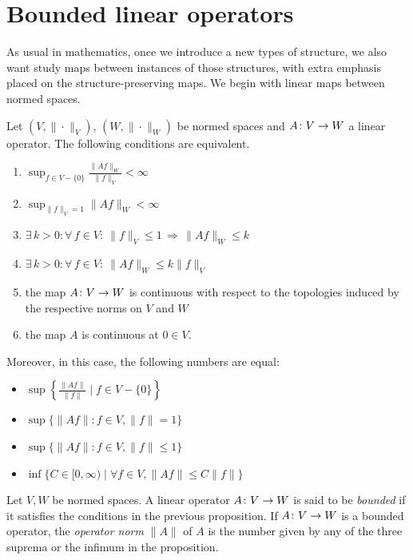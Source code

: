 \section{Bounded linear operators}

As usual in mathematics, once we introduce a new types of structure,
we also want study maps between instances of those structures, with
extra emphasis placed on the structure-preserving maps.
We begin with linear maps between normed spaces.

\begin{proposition}
\label{prp:boundequiv}
Let $(V,\|\cdot\|_V)$, $(W,\|\cdot\|_W)$ be normed spaces
and $A\colon V\to W$ a linear operator.
The following conditions are equivalent.
\begin{enumerate}[label=(\roman*)]
  \item \(\displaystyle \sup_{f\in V-\{0\}}\frac{\|Af\|_W }{ \|f\|_V}
    < \infty\)
  \item $\displaystyle \sup_{\|f\|_V=1}\|Af\|_W< \infty$
  \item $\exists \, k > 0 : \forall \, f\in V: \ \|f\|_V \leq 1\, \Rightarrow \, \|Af\|_W \leq k$
  \item $\exists \, k > 0 : \forall \, f\in V: \ \|Af\|_W\leq  k \|f\|_V$
  \item the map $A\colon V \to W$ is continuous with respect to the topologies induced by the respective norms on $V$ and $W$
  \item the map $A$ is continuous at $0\in V$. 
\end{enumerate}
Moreover, in this case, the following numbers are equal:
\begin{itemize}
  \item \(\sup\left\{\frac{\|Af\|}{\|f\|} \mid f\in V-\{0\}\right\}\)
  \item \(\sup \{\|Af\| : f\in V, \|f\|=1\}\)
  \item \(\sup \{\|Af\| : f\in V, \|f\|\leq 1\}\)
  \item \(\inf \{C\in[0,\infty) \mid \forall f\in V, \|Af\|\leq C\|f\|\}\)
\end{itemize}
\end{proposition}

\begin{definition}
  Let \(V,W\) be normed spaces.
  A linear operator $A\colon V\to W$ is said to be \emph{bounded} if it
  satisfies the conditions in the previous proposition.
  If $A\colon V \to W$ is a bounded operator, the \emph{operator
  norm} \(\|A\|\) of $A$ is the number given by
  any of the three suprema or the infimum in the proposition.
\end{definition}

